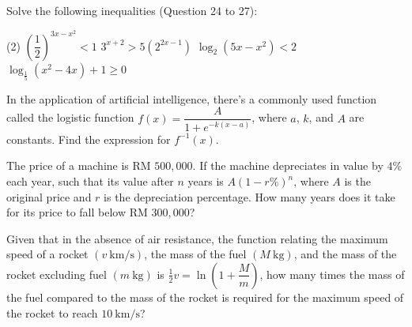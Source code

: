 \documentclass{report}
\begin{document}
        Solve the following inequalities (Question 24 to 27):
        \begin{tasks}[label=\arabic*.,resume](2)
            \task $\left(\dfrac{1}{2}\right)^{3 x-x^2}<1$
            \task $3^{x+2}>5\left(2^{2 x-1}\right)$
            \task $\log _2\left(5 x-x^2\right)<2$
            \task $\log _{\frac{1}{5}}\left(x^2-4 x\right)+1 \geq 0$
        \end{tasks}
        \begin{tasks}[label=\arabic*., resume]
            \task In the application of artificial intelligence, there's a commonly used function called the logistic function $f(x)=\dfrac{A}{1+e^{-k(x-a)}}$, where $a$, $k$, and $A$ are constants. Find the expression for $f^{-1}(x)$.

            \task The price of a machine is RM $500,000$. If the machine depreciates in value by $4\%$ each year, such that its value after $n$ years is $A(1-r\%)^n$, where $A$ is the original price and $r$ is the depreciation percentage. How many years does it take for its price to fall below RM $300,000$?
            
            \task Given that in the absence of air resistance, the function relating the maximum speed of a rocket $(v \mathrm{~km} / \mathrm{s})$, the mass of the fuel $(M \mathrm{~kg})$, and the mass of the rocket excluding fuel $(m \mathrm{~kg})$ is $\frac{1}{2} v=\ln \left(1+\dfrac{M}{m}\right)$, how many times the mass of the fuel compared to the mass of the rocket is required for the maximum speed of the rocket to reach $10 \mathrm{~km} / \mathrm{s}$?
        \end{tasks}
\end{document}
